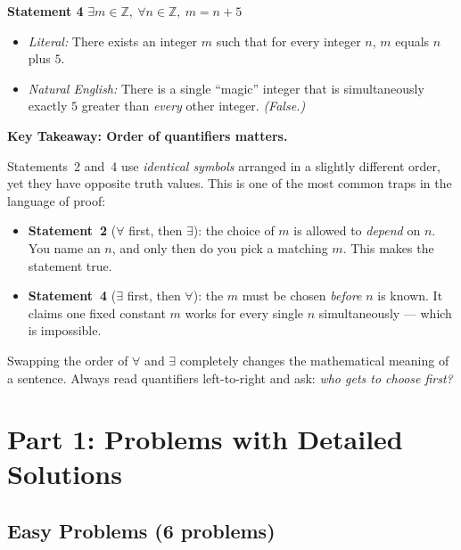 \documentclass[12pt]{article}
\begin{document}
\medskip

\noindent\textbf{Statement 4} \quad $\exists m \in \mathbb{Z},\ \forall n \in \mathbb{Z},\ m = n + 5$

\begin{itemize}
  \item \textit{Literal:} There exists an integer $m$ such that for every integer $n$, $m$ equals $n$ plus $5$.
  \item \textit{Natural English:} There is a single ``magic'' integer that is simultaneously exactly $5$ greater than \emph{every} other integer. \emph{(False.)}
\end{itemize}

\bigskip

\noindent\textbf{Key Takeaway: Order of quantifiers matters.}

Statements~2 and~4 use \emph{identical symbols} arranged in a slightly different order, yet they have opposite truth values. This is one of the most common traps in the language of proof:

\begin{itemize}
  \item \textbf{Statement~2} ($\forall$ first, then $\exists$): the choice of $m$ is allowed to \emph{depend} on $n$. You name an $n$, and only then do you pick a matching $m$. This makes the statement true.
  \item \textbf{Statement~4} ($\exists$ first, then $\forall$): the $m$ must be chosen \emph{before} $n$ is known. It claims one fixed constant $m$ works for every single $n$ simultaneously --- which is impossible.
\end{itemize}

\begin{tcolorbox}[colback=blue!5!white, colframe=blue!60!black, title=Quantifier Rule of Thumb]
Swapping the order of $\forall$ and $\exists$ completely changes the mathematical meaning of a sentence. Always read quantifiers left-to-right and ask: \emph{who gets to choose first?}
\end{tcolorbox}

\newpage

\section{Part 1: Problems with Detailed Solutions}

\subsection*{Easy Problems (6 problems)}
\end{document}
